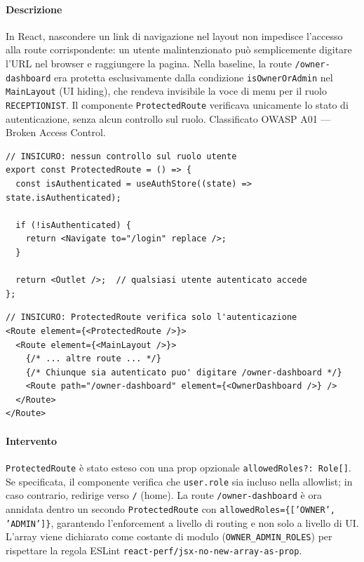 ﻿\documentclass[a4paper,12pt]{report}
\begin{document}
\paragraph{Descrizione}
In React, nascondere un link di navigazione nel layout non impedisce l'accesso alla route
corrispondente: un utente malintenzionato può semplicemente digitare l'URL nel browser e
raggiungere la pagina. Nella baseline, la route \texttt{/owner-dashboard} era protetta
esclusivamente dalla condizione \texttt{isOwnerOrAdmin} nel \texttt{MainLayout} (UI hiding),
che rendeva invisibile la voce di menu per il ruolo \texttt{RECEPTIONIST}.
Il componente \texttt{ProtectedRoute} verificava unicamente lo stato di autenticazione,
senza alcun controllo sul ruolo. Classificato OWASP A01 --- Broken Access Control.

\begin{insecurebox}[title={ProtectedRoute.tsx --- baseline: solo verifica autenticazione}]
\begin{lstlisting}[style=typescript]
// INSICURO: nessun controllo sul ruolo utente
export const ProtectedRoute = () => {
  const isAuthenticated = useAuthStore((state) => state.isAuthenticated);

  if (!isAuthenticated) {
    return <Navigate to="/login" replace />;
  }

  return <Outlet />;  // qualsiasi utente autenticato accede
};
\end{lstlisting}
\end{insecurebox}

\begin{insecurebox}[title={App.tsx --- baseline: /owner-dashboard accessibile a tutti gli autenticati}]
\begin{lstlisting}[style=typescript]
// INSICURO: ProtectedRoute verifica solo l'autenticazione
<Route element={<ProtectedRoute />}>
  <Route element={<MainLayout />}>
    {/* ... altre route ... */}
    {/* Chiunque sia autenticato puo' digitare /owner-dashboard */}
    <Route path="/owner-dashboard" element={<OwnerDashboard />} />
  </Route>
</Route>
\end{lstlisting}
\end{insecurebox}

\paragraph{Intervento}
\texttt{ProtectedRoute} è stato esteso con una prop opzionale \texttt{allowedRoles?: Role[]}.
Se specificata, il componente verifica che \texttt{user.role} sia incluso nella allowlist;
in caso contrario, redirige verso \texttt{/} (home). La route \texttt{/owner-dashboard}
è ora annidata dentro un secondo \texttt{ProtectedRoute} con
\texttt{allowedRoles=\{['OWNER', 'ADMIN']\}}, garantendo l'enforcement a livello di routing
e non solo a livello di UI. L'array viene dichiarato come costante di modulo
(\texttt{OWNER\_ADMIN\_ROLES}) per rispettare la regola ESLint
\texttt{react-perf/jsx-no-new-array-as-prop}.
\end{document}
